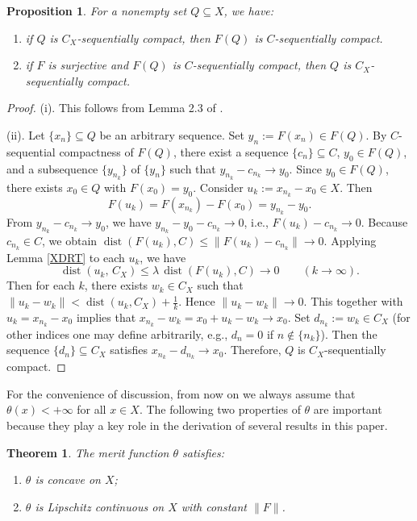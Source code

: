 \documentclass[10pt,a4paper]{amsart}
\DeclareMathOperator{\dist}{dist}
\newtheorem{theorem}{Theorem}[section]
\newtheorem{proposition}{Proposition}[section]
\begin{document}
\begin{proposition}
	For a nonempty set $Q \subseteq X$, we have:
	\begin{enumerate}
		\item[(i)] if $Q$ is $C_X$-sequentially compact, then $F(Q)$ is $C$-sequentially compact.
		\item[(ii)] if $F$ is surjective     and    $F(Q)$ is $C$-sequentially compact, then   $Q$ is $C_X$-sequentially compact.
	\end{enumerate}
\end{proposition}

\begin{proof}
	(i). This follows from Lemma 2.3 of   \cite{Han2026}.
	
	(ii). Let $\{x_n\} \subseteq Q$ be an arbitrary sequence. Set $y_n:=F(x_n)\in F(Q)$. By $C$-sequential compactness of $F(Q)$, there exist a sequence $\{c_n\}  \subseteq C$, $y_0\in F(Q)$, and a subsequence $\{y_{n_k}\} $ of  $\{y_n\}$ such that
$	y_{n_k}-c_{n_k}\to y_0  $.
	Since $y_0\in F(Q)$, there exists $x_0\in Q$ with $F(x_0)=y_0$. Consider $u_k:=x_{n_k}-x_0\in X$. Then
	\[
	F(u_k)=F(x_{n_k})-F(x_0)=y_{n_k}-y_0.
	\]
	From $y_{n_k}-c_{n_k}\to y_0$, we have $y_{n_k}-y_0-c_{n_k}\to0$, i.e.,
$	F(u_k)-c_{n_k}\to 0 .$
	Because $c_{n_k}\in C$, we obtain $\dist(F(u_k),C)\le \|F(u_k)-c_{n_k}\|\to0$.
	Applying Lemma \ref{XDRT} to each $u_k$, we  have 
	\[
	\dist(u_k,\,C_X)\le \lambda \,\dist(F(u_k),C) \to 0 \qquad(k\to\infty).
	\]
Then for each $k$, there exists $w_k\in C_X$ such that $\|u_k-w_k\|<\dist(u_k,C_X)+\frac1k$. Hence $\|u_k-w_k\|\to0$.
	This together with  $u_k=x_{n_k}-x_0$  implies that 
	$	x_{n_k}-w_k = x_0 + u_k - w_k \to x_0 .$
	Set $d_{n_k}:=w_k\in C_X$ (for other indices one may define arbitrarily, e.g., $d_n=0$ if $n\notin\{n_k\}$). Then the sequence $\{d_n\}\subseteq C_X$ satisfies $x_{n_k}-d_{n_k}\to x_0$. Therefore,  $Q$ is $C_X$-sequentially compact.
\end{proof}

For the convenience of discussion, from now on we always assume that $\theta(x)<+\infty$ for all $x\in X$. The following two properties of $\theta$ are important because they play a key role in the derivation of several results in this paper.

\begin{theorem}\label{YL:thetaprop2}
	The  merit function $\theta$ satisfies:
	\begin{enumerate}
		\item[(i)] $\theta$ is concave on $X$;
		\item[(ii)] $\theta$ is Lipschitz continuous on $X$ with constant $\|F\|$.
	\end{enumerate}
\end{theorem}
\end{document}
